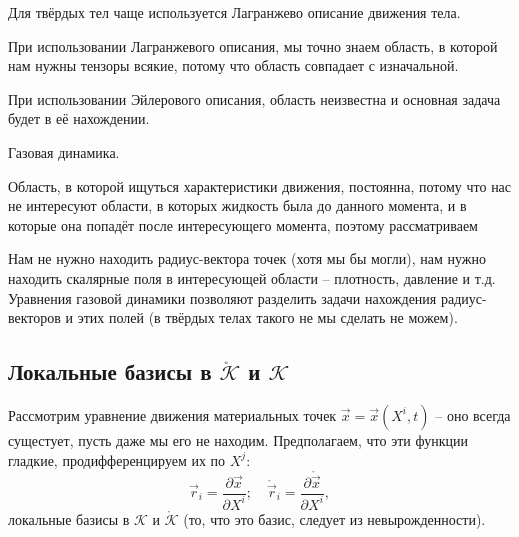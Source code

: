 \begin{example} 
  Для твёрдых тел чаще используется Лагранжево описание движения тела.
  
  \begin{figure}[H]
  	\centering
  	
  \end{figure}
  
  При использовании Лагранжевого описания, мы точно знаем область, в которой нам нужны тензоры
  всякие, потому что область совпадает с изначальной.

  При использовании Эйлерового описания, область неизвестна и основная задача будет в её
  нахождении.
\end{example}

\begin{example}
  Газовая динамика.
  
  \begin{figure}[H]
  	\centering
  	
  \end{figure}
  
  Область, в которой ищуться характеристики движения, постоянна, потому что нас не интересуют
  области, в которых жидкость была до данного момента, и в которые она попадёт после интересующего 
  момента, поэтому рассматриваем

  Нам не нужно находить радиус-вектора точек (хотя мы бы могли), нам нужно находить скалярные поля
  в интересующей области -- плотность, давление и т.д. Уравнения газовой динамики позволяют разделить
  задачи нахождения радиус-векторов и этих полей (в твёрдых телах такого не мы сделать не можем).
\end{example}

\subsection{Локальные базисы в $\mathring{\mathcal{K}}$ и $\mathcal{K}$}

Рассмотрим уравнение движения материальных точек $\vec{x} = \vec{x} (X^i, t)$ -- оно всегда
сущестует, пусть даже мы его не находим. Предполагаем, что эти функции гладкие, продифференцируем
их по $X^j$:
\[
  \vec{r}_i = \dfrac{\partial \vec{x}}{\partial X^i}; \quad
  \mathring{\vec{r}}_i = \dfrac{\partial \mathring{\vec{x}}}{\partial X^i},
\]
локальные базисы в $\mathcal{K}$ и $\mathring{\mathcal{K}}$ (то, что это базис, следует из
невырожденности).

\begin{figure}[H]
	\centering
	
\end{figure}

